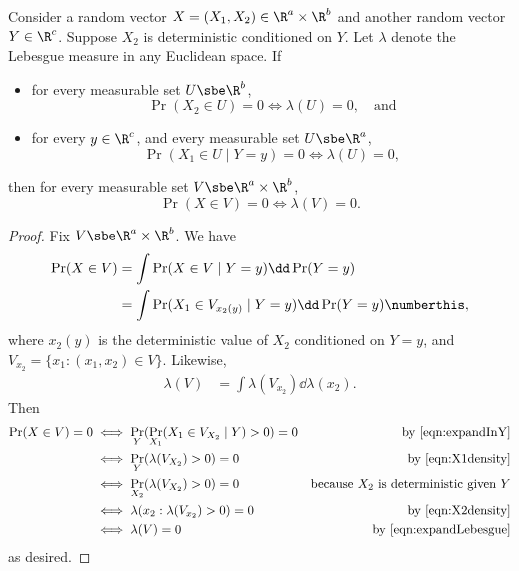 \documentclass[main.tex]{subfiles}
\begin{document}
\begin{lemma}\label{lemma:conditionalDensity}
Consider a random vector $X = (X_1, X_2) \in \R^a \times \R^b$ and another random vector $Y \in \R^c$.
Suppose $X_2$ is deterministic conditioned on $Y$.
Let $\lambda$ denote the Lebesgue measure in any Euclidean space.
If
\begin{itemize}
\item for every measurable set $U \sbe \R^b$,
  \begin{equation}
    \Pr(X_2 \in U) = 0 \iff \lambda(U) = 0, \quad \text{and}
    \label{eqn:X2density}
  \end{equation}
\item for every $y \in \R^c$, and every measurable set $U \sbe \R^a$,
  \begin{equation}
    \Pr(X_1 \in U \mid Y = y) = 0 \iff \lambda(U) = 0,
    \label{eqn:X1density}
  \end{equation}
\end{itemize}
then for every measurable set $V \sbe \R^a \times \R^b$,
\[\Pr(X \in V) = 0 \iff  \lambda(V) = 0
.\]
\end{lemma}
\begin{proof}
  Fix $V \sbe \R^a \times \R^b$.
We have
\begin{align*}
\Pr(X \in V)
  &=
    \int \Pr(X \in V \mid Y = y)\dd\Pr(Y = y)
    \\
  &=
    \int \Pr(X_1 \in V_{x_2(y)} \mid Y = y)\dd\Pr(Y = y)
    \numberthis\label{eqn:expandInY}
,
\end{align*}
where $x_2(y)$ is the deterministic value of $X_2$ conditioned on $Y = y$, and $V_{x_2} = \{x_1: (x_1, x_2) \in V\}$.
Likewise,
\begin{align}
\lambda(V)
  &=
    \int \lambda(V_{x_2}) \dd \lambda(x_2)
.
  \label{eqn:expandLebesgue}
\end{align}
Then
\begin{align*}
\Pr(X \in V) = 0
&\iff
  \Pr_{Y}(\Pr_{X_1}(X_1 \in V_{X_2} \mid Y) > 0) = 0
  &\text{by \cref{eqn:expandInY}}
  \\
&\iff
  \Pr_{Y}(\lambda(V_{X_2}) > 0) = 0
  &\text{by \cref{eqn:X1density}}
  \\
&\iff
  \Pr_{X_2}(\lambda(V_{X_2}) > 0) = 0
  &\text{because $X_2$ is deterministic given $Y$}
  \\
&\iff
  \lambda(x_2: \lambda(V_{x_2}) > 0) = 0
  &\text{by \cref{eqn:X2density}}
  \\
&\iff
  \lambda(V) = 0
  &\text{by \cref{eqn:expandLebesgue}}
\end{align*}
as desired.

\end{proof}
\end{document}
